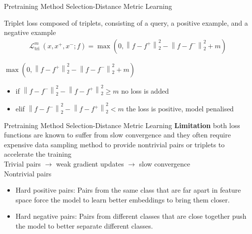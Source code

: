 \documentclass[aspectratio=169,xcolor=dvipsnames]{beamer}
\begin{document}
\begin{frame}{Pretraining Method Selection-Distance Metric Learning}
    \begin{block}{Triplet loss}
    composed of triplets, consisting of a query, a positive example, and a negative example
        \begin{align*}
        \mathcal{L}_{\text {tri }}^m\left(x, x^{+}, x^{-} ; f\right)=\max \left(0,\left\|f-f^{+}\right\|_2^2-\left\|f-f^{-}\right\|_2^2+m\right)
        \end{align*}
     \end{block}
    \bigskip
    $\max \left(0,\left\|f-f^{+}\right\|_2^2-\left\|f-f^{-}\right\|_2^2+m\right)$ 
    \begin{itemize}
        \item if $\left\|f-f^{-}\right\|_2^2 - \left\|f-f^{+}\right\|_2^2 \geq m$ no loss is added\\
        \item elif $\left\|f-f^{-}\right\|_2^2 - \left\|f-f^{+}\right\|_2^2 < m$ the loss is positive, model penalised
    \end{itemize}
    
\end{frame}


\begin{frame}{Pretraining Method Selection-Distance Metric Learning}
    \textbf{Limitation} both loss functions are known to suffer from slow convergence and they often require expensive data sampling method to provide nontrivial pairs or triplets to accelerate the training\\
    Trivial pairs $\rightarrow$ weak gradient updates $\rightarrow$ slow convergence\\
    \bigskip
    Nontrivial pairs
    \begin{itemize}
        \item Hard positive pairs: Pairs from the same class that are far apart in feature space force the model to learn better embeddings to bring them closer.
        \item Hard negative pairs: Pairs from different classes that are close together push the model to better separate different classes.
    \end{itemize}
\end{frame}

\end{document}
